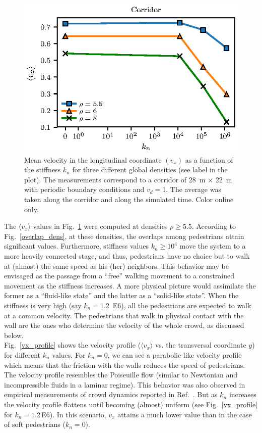 \documentclass[preprint,12pt]{elsarticle}
\begin{document}
\begin{figure}[htbp!]
\centering
\includegraphics[width=0.7\columnwidth]{./kn_vs_vx_corridor.eps}
\caption{\label{kn_vs_vx_corridor} Mean velocity in the longitudinal coordinate $(v_x)$
 as a function of the stiffness $k_n$ for three different global densities (see label in the plot). 
 The measurements correspond to a corridor of 28~m $\times$ 22~m with periodic boundary conditions and $v_d=1$.
 The average was taken along the corridor and along the simulated time. Color online only.      }
\end{figure}

The $\langle v_x\rangle$ values in Fig.~\ref{kn_vs_vx_corridor} 
were computed at densities $\rho\geq 5.5$. According to 
Fig.~\ref{overlap_dens},
at these densities, the overlaps among pedestrians attain significant values. Furthermore, 
stiffness values $k_n\geq 10^4$ move the system to a more heavily connected 
stage, and thus, pedestrians have no choice but to walk at 
(almost) the same speed as his (her) neighbors. This 
behavior may be envisaged as the passage from a ``free'' 
walking movement to a  constrained movement as the stiffness increases. A more 
physical picture would assimilate the former as a ``fluid-like 
state'' and the latter as a ``solid-like state''. When the stiffness is 
very high (say $k_n=$1.2~E6), all the pedestrians 
are expected to walk at a common velocity. The 
pedestrians that walk in physical contact with the wall are the ones who 
determine the velocity of the whole crowd, as discussed 
below.\\

Fig.~\ref{vx_profile} shows the velocity profile ($\langle v_x \rangle$ vs. the transversal coordinate $y$) for different $k_n$ values. For $k_n=0$, we can see a parabolic-like velocity profile which means that the friction with the walls reduces the speed of pedestrians. The velocity profile resembles the Poiseuille flow (similar to Newtonian and incompressible fluids in a laminar regime). This behavior was also observed in empirical measurements of crowd dynamics reported in Ref.~\cite{zhang2013empirical}. But as $k_n$ increases the velocity profile flattens until becoming (almost) uniform (see Fig.~\ref{vx_profile} for $k_n=1.2\,$E6). In this scenario, $v_x$ attains a much lower  value  than in the case of soft pedestrians ($k_n=$0).\\
\end{document}
